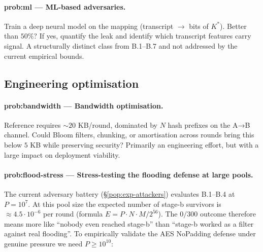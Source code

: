 \documentclass[11pt,a4paper]{article}
\begin{document}
\paragraph{prob:ml --- ML-based adversaries.} Train a deep neural model on the mapping (transcript $\to$ bits of $K^*$). Better than $50\%$? If yes, quantify the leak and identify which transcript features carry signal. A structurally distinct class from B.1--B.7 and not addressed by the current empirical bounds.

\subsection{Engineering optimisation}

\paragraph{prob:bandwidth --- Bandwidth optimisation.} Reference requires $\sim 20$ KB/round, dominated by $N$ hash prefixes on the A→B channel. Could Bloom filters, chunking, or amortisation across rounds bring this below $5$ KB while preserving security? Primarily an engineering effort, but with a large impact on deployment viability.

\paragraph{prob:flood-stress --- Stress-testing the flooding defense at large pools.} The current adversary battery (§\ref{pop:exp-attackers}) evaluates B.1--B.4 at $P = 10^7$. At this pool size the expected number of stage-b survivors is $\approx 4{.}5 \cdot 10^{-6}$ per round (formula $E = P \cdot N \cdot M / 2^{56}$). The $0/300$ outcome therefore means more like ``nobody even reached stage-b'' than ``stage-b worked as a filter against real flooding''. To empirically validate the AES NoPadding defense under genuine pressure we need $P \geq 10^{10}$:
\end{document}
